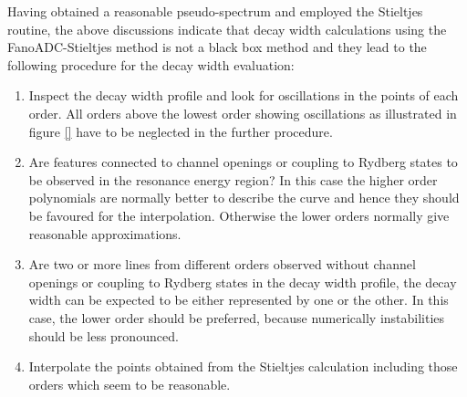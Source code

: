 Having obtained a reasonable pseudo-spectrum and employed the Stieltjes routine,
the above discussions indicate that decay width calculations using the FanoADC-Stieltjes
method is not a black box method and they lead to the
following procedure for the decay width evaluation:
\begin{enumerate}
 \item Inspect the decay width profile and look for oscillations in the
       points of each order. All orders above the lowest order showing oscillations as
       illustrated in figure \ref{} have to be neglected in the further
       procedure.
 \item Are features connected to channel openings or coupling to Rydberg states
       to be observed in the resonance energy region? In this case the higher
       order polynomials are normally better to describe the curve and hence they
       should be favoured for the interpolation. Otherwise the lower orders
       normally give reasonable approximations.
 \item Are two or more lines from different orders observed without channel
       openings or coupling to Rydberg states in the decay width profile,
       the decay width can be expected to be either represented by one or the
       other. In this case, the lower order should be preferred, because
       numerically instabilities should be less pronounced.
 \item Interpolate the points obtained from the Stieltjes calculation including
       those orders which seem to be
       reasonable.
\end{enumerate}
